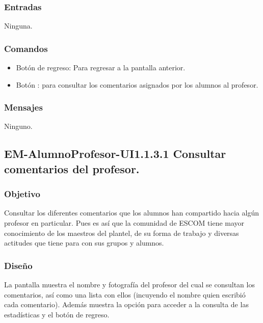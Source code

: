 \subsubsection{Entradas}
	\noindent
	Ninguna.

\subsubsection{Comandos}
	\begin{itemize}
		\item Botón de regreso: Para regresar a la pantalla anterior.
		\item Botón  : para consultar los comentarios asignados por los alumnos al profesor.
	\end{itemize}

\subsubsection{Mensajes}
	\noindent
	Ninguno.


\subsection{EM-AlumnoProfesor-UI1.1.3.1 Consultar comentarios del profesor.}

\subsubsection{Objetivo}
	\noindent
	Consultar los diferentes comentarios que los alumnos han compartido hacia algún profesor en particular. Pues es así que la comunidad de ESCOM tiene mayor conocimiento de los maestros del plantel, de su forma de
	trabajo y diversas actitudes que tiene para con sus grupos y alumnos.

\subsubsection{Diseño}
	\noindent
	La pantalla muestra el nombre y fotografía del profesor del cual se consultan los comentarios, así como una lista con ellos (incuyendo el nombre quien escribió cada comentario).
	Además muestra la opción para acceder a la consulta de las estadísticas y el botón de regreso.

\pagebreak
{}

